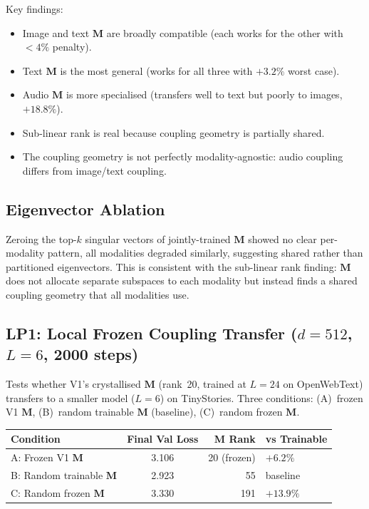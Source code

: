 \documentclass[11pt, a4paper]{article}
\newcommand{\M}{\mathbf{M}}
\theoremstyle{remark}
\begin{document}
Key findings:
\begin{itemize}[nosep]
\item Image and text $\M$ are broadly compatible (each works for the other with $<4\%$ penalty).
\item Text $\M$ is the most general (works for all three with $+3.2\%$ worst case).
\item Audio $\M$ is more specialised (transfers well to text but poorly to images, $+18.8\%$).
\item Sub-linear rank is real because coupling geometry is partially shared.
\item The coupling geometry is not perfectly modality-agnostic: audio coupling differs from image/text coupling.
\end{itemize}

\subsection{Eigenvector Ablation}

Zeroing the top-$k$ singular vectors of jointly-trained $\M$ showed no clear per-modality pattern, all modalities degraded similarly, suggesting shared rather than partitioned eigenvectors.
This is consistent with the sub-linear rank finding: $\M$ does not allocate separate subspaces to each modality but instead finds a shared coupling geometry that all modalities use.

\subsection{LP1: Local Frozen Coupling Transfer ($d{=}512$, $L{=}6$, 2000 steps)}

Tests whether V1's crystallised $\M$ (rank~20, trained at $L{=}24$ on OpenWebText) transfers to a smaller model ($L{=}6$) on TinyStories.
Three conditions: (A)~frozen V1 $\M$, (B)~random trainable $\M$ (baseline), (C)~random frozen $\M$.

\begin{center}\small
\begin{tabular}{@{}lcrl@{}}
\toprule
\textbf{Condition} & \textbf{Final Val Loss} & \textbf{M Rank} & \textbf{vs Trainable} \\
\midrule
A: Frozen V1 $\M$     & 3.106 & 20 (frozen)  & $+6.2\%$ \\
B: Random trainable $\M$ & 2.923 & 55           & baseline \\
C: Random frozen $\M$   & 3.330 & 191          & $+13.9\%$ \\
\bottomrule
\end{tabular}
\end{center}
\end{document}
